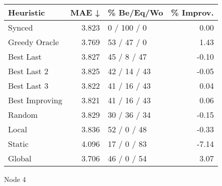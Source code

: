 \begin{tabular}{lrlr}
\toprule
\textbf{Heuristic} & \textbf{MAE ↓} & \textbf{\% Be/Eq/Wo} & \textbf{\% Improv.} \\
\midrule
            Synced &          3.823 &          0 / 100 / 0 &                0.00 \\
     Greedy Oracle &          3.769 &          53 / 47 / 0 &                1.43 \\
         Best Last &          3.827 &          45 / 8 / 47 &               -0.10 \\
       Best Last 2 &          3.825 &         42 / 14 / 43 &               -0.05 \\
       Best Last 3 &          3.822 &         41 / 16 / 43 &                0.04 \\
    Best Improving &          3.821 &         41 / 16 / 43 &                0.06 \\
            Random &          3.829 &         30 / 36 / 34 &               -0.15 \\
             Local &          3.836 &          52 / 0 / 48 &               -0.33 \\
            Static &          4.096 &          17 / 0 / 83 &               -7.14 \\
            Global &          3.706 &          46 / 0 / 54 &                3.07 \\
\bottomrule
\end{tabular}
\caption{Node 4}
\label{tab:ds_non_lr05_le1_bs4_4}
